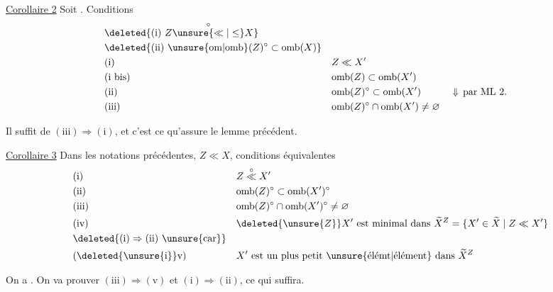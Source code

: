 \uline{Corollaire 2} Soit
. Conditions 
\[
\begin{aligned}
&\deleted{\text{(i) }Z\overset{\circ}{\unsure{\ll|\leq}}X}\\
&\deleted{\text{(ii) }\unsure{\mathrm{om}|\mathrm{omb}}(Z)^\circ\subset\mathrm{omb}(X)}\\
&\text{(i)} && Z\ll X'\\
&\text{(i bis)} && \mathrm{omb}(Z)\subset\mathrm{omb}(X')\\
&\text{(ii)} && \mathrm{omb}(Z)^\circ\subset\mathrm{omb}(X') && \Downarrow\,\text{par ML 2.}\\
&\text{(iii)} && \mathrm{omb}(Z)^\circ\cap\mathrm{omb}(X')\neq\varnothing
\end{aligned}
\]

Il suffit de  $(\mathrm{iii})\Longrightarrow(\mathrm{i})$, et c'est ce qu'assure le lemme précédent.

\uline{Corollaire 3} Dans les notations précédentes, $Z\ll X$, conditions équivalentes
\[
\begin{aligned}
&\text{(i)} && Z\overset{\circ}{\ll}X'\\
&\text{(ii)} && \mathrm{omb}(Z)^\circ\subset\mathrm{omb}(X')^\circ\\
&\text{(iii)} && \mathrm{omb}(Z)^\circ\cap\mathrm{omb}(X')^\circ\neq\varnothing\\
&\text{(iv)} && \deleted{\unsure{Z}}X'\ \text{est minimal dans }\widetilde X^{Z}=\{X'\in\widetilde X\mid Z\ll X'\}\\
&\deleted{\mathrm{(i)}\Rightarrow\mathrm{(ii)}\ \text{\unsure{car}}}\\
&\text{(\deleted{\unsure{i}}v)} && X'\ \text{est un plus petit \unsure{élémt|élément} dans }\widetilde X^{Z}
\end{aligned}
\]

On a
. On va prouver $(\mathrm{iii})\Longrightarrow(\mathrm{v})$ et $(\mathrm{i})\Longrightarrow(\mathrm{ii})$, ce qui suffira.

